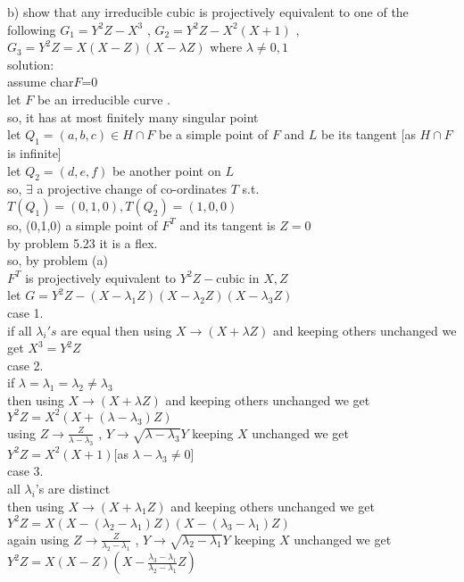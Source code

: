 \documentclass[11pt]{article}
\begin{document}
b) show that any irreducible cubic is projectively equivalent to one of the following  $G_1=Y^2Z-X^3$ , $G_2=Y^2Z-X^2(X+1)$ , $G_3=Y^2Z=X(X-Z)(X-\lambda Z)$ where $\lambda\neq 0, 1$\\
solution:\\
assume char$F$=0\\ 
let $F$ be an irreducible curve .\\
so, it has at most finitely many singular point\\
let $Q_1=(a,b,c)\in H\cap F$ be a simple point of $F$ and $L$ be its tangent [as $H\cap F$ is infinite] \\
let $Q_2=(d,e,f)$ be another point on $L$\\
so, $\exists$ a projective change of co-ordinates $T$ s.t. $T(Q_1)=(0,1,0),T(Q_2)=(1,0,0)$\\
so, (0,1,0) a simple point  of $F^T$ and its tangent is $Z=0$\\
by problem 5.23 it is a flex.\\
so, by problem (a)\\
$F^T$ is projectively equivalent to $Y^2Z-$cubic in $X,Z$\\
let $G=Y^2Z-(X-\lambda_1Z)(X-\lambda_2 Z)(X-\lambda_3 Z)$\\
case 1.\\
if all $\lambda_i's$ are equal then using $X\to (X+\lambda Z)$ and keeping others unchanged we get $X^3=Y^2Z$\\
case 2.\\
if $\lambda=\lambda_1=\lambda_2\neq \lambda_3$\\
then using $X\to (X+\lambda Z)$ and keeping others unchanged we get\\
$Y^2Z=X^2(X+(\lambda-\lambda_3)Z)$\\
using $Z\to \frac{Z}{\lambda-\lambda_3}$ , $Y\to\sqrt{\lambda-\lambda_3}Y$ keeping $X$ unchanged we get\\
$Y^2Z=X^2(X+1)$[as $\lambda-\lambda_3\neq 0$]\\
case 3.\\
all $\lambda_i$'s are distinct\\
then using $X\to (X+\lambda_1 Z)$ and keeping others unchanged we get\\
$Y^2Z=X(X-(\lambda_2-\lambda_1)Z)(X-(\lambda_3-\lambda_1)Z)$\\
again  using $Z\to \frac{Z}{\lambda_2-\lambda_1}$ , $Y\to\sqrt{\lambda_2-\lambda_1}Y$ keeping $X$ unchanged we get\\
$Y^2Z=X(X-Z)(X-\frac{\lambda_3-\lambda_1}{\lambda_2-\lambda_1}Z)$\\
\end{document}
